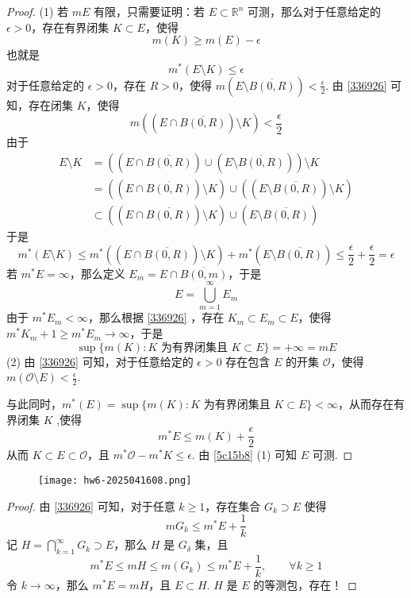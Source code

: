 \begin{proof}
(1)
若 $mE$ 有限，只需要证明：若 $E\subset \mathbb{R}^{n}$ 可测，那么对于任意给定的 $\epsilon>0$，存在有界闭集 $K\subset E$，使得
\[
m(K)\geq m(E)-\epsilon
\]
也就是
\[
m^{*}(E\setminus K)\leq \epsilon
\]
对于任意给定的 $\epsilon>0$，存在 $R>0$，使得 $m(E\setminus  \overline{B(0,R)} )<\frac{\epsilon}{2}$. 由 \cref{336926} 可知，存在闭集 $K$，使得
\[
m((E\cap  \overline{B(0,R)})\setminus K)< \frac{\epsilon}{2}
\]
由于
\[
\begin{aligned}
E\setminus K & =((E\cap  \overline{B(0,R)})\cup(E\setminus  \overline{B(0,R)}))\setminus K \\
 & =((E\cap  \overline{B(0,R)})\setminus K)\cup((E\setminus  \overline{B(0,R)})\setminus K) \\
 & \subset((E\cap  \overline{B(0,R)})\setminus K)\cup(E\setminus   \overline{B(0,R)})
\end{aligned}
\]
于是
\[
m^{*}(E\setminus K)\leq m^{*}((E\cap  \overline{B(0,R)})\setminus K)+m^{*}(E\setminus  \overline{B(0,R)})\leq \frac{\epsilon}{2}+\frac{\epsilon}{2}=\epsilon
\]
若 $m^{*}E=\infty$，那么定义 $E_m=E\cap \overline{B(0,m)}$，于是
\[
E=\bigcup_{m=1}^{\infty} E_m
\]
由于 $m^{*}E_m<\infty$，那么根据 \cref{336926} ，存在 $K_m\subset E_m\subset E$，使得 $m^{*}K_m+1\geq m^{*}E_m\to \infty$，于是
\[
\sup \{ m(K):K\text{ 为有界闭集且 }K\subset E \}=+\infty=mE
\]
(2) 由 \cref{336926} 可知，对于任意给定的 $\epsilon>0$ 存在包含 $E$ 的开集 $\mathcal{O}$，使得 $m(\mathcal{O}\setminus E)<\frac{\epsilon}{2}$.

与此同时，$m^{*}(E)=\sup \{ m(K):K\text{ 为有界闭集且 }K\subset E \}<\infty$，从而存在有界闭集 $K$ ,使得
\[
m^{*}E\leq m(K)+\frac{\epsilon}{2}
\]
从而 $K\subset E\subset \mathcal{O}$，且 $m^{*}\mathcal{O}-m^{*}K\leq\epsilon$. 由 \cref{5c15b8} (1) 可知 $E$ 可测.

\end{proof}

\begin{exercise}
\begin{figure}[H]
\centering
\texttt{[image: hw6-2025041608.png]}
\label{}
\end{figure}
\end{exercise}
\begin{proof}
由 \cref{336926} 可知，对于任意 $k\geq1$，存在集合 $G_k\supset E$ 使得
\[
mG_{k}\leq m^{*}E+\frac{1}{k}
\]
记 $H=\bigcap_{k=1}^{\infty}G_k\supset E$，那么 $H$ 是 $G_{\delta}$ 集，且
\[
m^{*}E\leq mH\leq m(G_k)\leq m^{*}E+\frac{1}{k},\qquad \forall k\geq 1
\]
令 $k\to \infty$，那么 $m^{*}E=mH$，且 $E\subset H$. $H$ 是 $E$ 的等测包，存在！
\end{proof}

